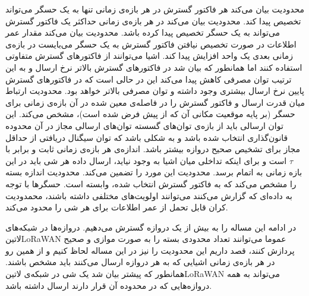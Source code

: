 محدودیت  بیان می‌کند هر فاکتور گسترش در هر بازه‌ی زمانی تنها به یک حسگر می‌تواند تخصیص پیدا کند.
محدودیت  بیان می‌کند در هر بازه‌ی زمانی حداکثر یک فاکتور گسترش می‌تواند به یک حسگر تخصیص پیدا کرده باشد.
محدودیت  بیان می‌کند مقدار عمر اطلاعات در صورت تخصیص نیافتن فاکتور گسترش به یک حسگر می‌بایست در بازه‌ی زمانی بعدی یک واحد افزایش پیدا کند.
اشیا می‌توانند از فاکتورهای گسترش متفاوتی استفاده کنند اما همانطور که بیان شد در فاکتورهای گسترش بالاتر نرخ ارسال و به این ترتیب توان مصرفی کاهش پیدا می‌کند این در حالی است که
در فاکتورهای گسترش پایین نرخ ارسال بیشتری وجود داشته و توان مصرفی بالاتر خواهد بود. محدودیت  ارتباط میان قدرت ارسال و فاکتور گسترش را در فاصله‌ی
معین شده در آن بازه‌ی زمانی برای حسگر (بر پایه موقعیت مکانی آن که از پیش فرض شده است)، مشخص می‌کند.
این توان ارسالی باید از بازه‌ی توان‌های گسسته توان‌های ارسالی مجاز در آن محدوده قانون‌گذاری انتخاب شده باشد و به شکلی باشد که توان سیگنال دریافتی از حداقل مجاز برای تشخیص صحیح دروازه بیشتر باشد.
اندازه‌ی هر بازه‌ی زمانی ثابت و برابر با $\tau$ است و برای اینکه تداخلی میان اشیا به وجود نیاید، ارسال داده هر شی باید در این بازه زمانی به اتمام برسد.
محدودیت  این مورد را تضمین می‌کند.
محدودیت  اندازه بسته را مشخص می‌کند که به فاکتور گسترش انتخاب شده، وابسته است.
حسگرها با توجه به داده‌ای که گزارش می‌کنند می‌توانند اولویت‌های مختلفی داشته باشند، محمدودیت  کران قابل تحمل از عمر اطلاعات برای هر شی را محدود می‌کند.


در ادامه این مساله را به بیش از یک دروازه گسترش می‌دهیم. دروازه‌ها در شبکه‌های ‌لاتین{LoRaWAN} عموما می‌توانند تعداد محدودی بسته را به صورت موازی و صحیح پردازش کنند، قصد داریم این محدودیت را
نیز در این مساله لحاظ کنیم و از همین رو در هر بازه‌ی زمانی اشیایی که به هر دروازه ارسال می‌کنند باید مشخص باشند. همانطور که پیشتر بیان شد یک شی در شبکه‌ی ‌لاتین{LoRaWAN} می‌تواند به همه دروازه‌هایی
که در محدوده آن قرار دارند ارسال داشته باشد.
